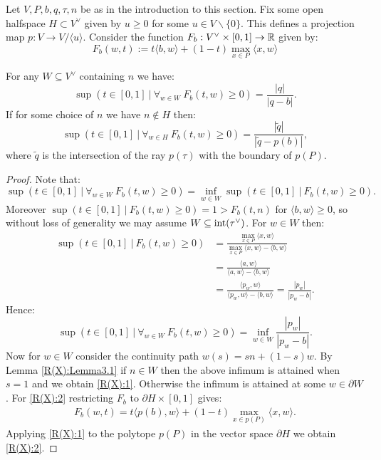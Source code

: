 Let \(V,P,b,q,\tau,n\) be as in the introduction to this section. Fix some open halfspace \(H \subset V^\vee\) given by \(u \ge 0\) for some \(u \in V \backslash \{0\}\). This defines a projection map \(p: V \to V/\langle u \rangle.\) Consider the function \(F_b: V^\vee \times  [0,1] \to \mathbb{R}\) given by:
\[
F_b(w,t) := t \langle b,w \rangle+ (1-t) \max_{x \in P} \langle x, w \rangle
\]
\begin{corollary} \label{cor:convexgeomextra}
For any \(W \subseteq V^\vee\) containing \(n\) we have:
\begin{equation} \label{R(X):1}
\sup (t \in [0,1] \ | \ \forall_{w \in W} \  F_b(t,w) \ge 0) = \frac{|q|}{|q-b|}.
\end{equation}
If for some choice of \(n\) we have \(n \not\in H\) then:
\begin{equation} \label{R(X):2}
\sup (t \in [0,1] \ | \ \forall_{w \in H} \  F_b(t,w) \ge 0) = \frac{|\tilde{q}|}{|\tilde{q} - p(b)|},
\end{equation}
where \(\tilde{q}\) is the intersection of the ray \(p(\tau)\) with the boundary of \(p(P)\).
\end{corollary}
\begin{proof}
Note that:
\[
\sup (t \in [0,1] \ | \ \forall_{w \in W} \  F_b(t,w) \ge 0) = \inf_{w \in W} \sup (t \in [0,1] \ | \  F_b(t,w) \ge 0).
\]
Moreover \(\sup (t \in [0,1] \ | \  F_b(t,w) \ge 0) = 1 > F_b(t,n)\) for \(\langle b,w \rangle \ge 0\), so without loss of generality we may assume \(W \subseteq \text{int}(\tau^\vee)\). For \(w \in W\) then:
\begin{align*}
\sup (t \in [0,1] \ | \  F_b(t,w) \ge 0) &= \frac{\max_{x \in P} \langle x, w \rangle}{ \max_{x \in P} \langle x, w \rangle - \langle b, w \rangle } \\ &= \frac{ \langle a,w \rangle}{\langle a ,w \rangle - \langle b,w \rangle} \\ &= \frac{ \langle p_w,w \rangle}{\langle p_w ,w \rangle - \langle b,w \rangle} = \frac{|p_w|}{|p_w-b|}.
\end{align*}
Hence:
\[
\sup (t \in [0,1] \ | \ \forall_{w \in W} \  F_b(t,w) \ge 0) = \inf_{w \in W} \frac{|p_w|}{|p_w-b|}.
\]
Now for \(w \in W\) consider the continuity path \(w(s) = sn + (1-s)w\). By Lemma \ref{R(X):Lemma3.1} if \(n \in W\) then the above infimum is attained when \(s=1\) and we obtain \normalfont{(}\ref{R(X):1}\normalfont{)}. Otherwise the infimum is attained at some \(w \in \partial W\). For \normalfont{(}\ref{R(X):2}\normalfont{)} restricting \(F_b\) to \(\partial H \times [0,1]\) gives:
\begin{align*}
F_b(w,t) =  t \langle p(b) ,w \rangle+ (1-t) \max_{x \in p(P)} \langle x, w \rangle.
\end{align*}
Applying \normalfont{(}\ref{R(X):1}\normalfont{)} to the polytope \(p(P)\) in the vector space \(\partial H\) we obtain \normalfont{(}\ref{R(X):2}\normalfont{)}.
\end{proof}
